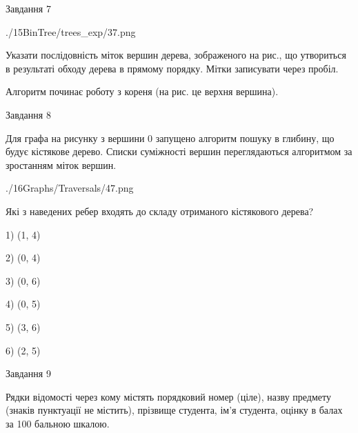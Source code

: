 \documentclass[12pt, ukrainian]{article}
\begin{document}
{\vspace{10mm}\par

\newpage
\begin{minipage}[t]{9.7cm}
               
{\begin{center}Завдання {7}\end{center}}
\vspace{-6mm}

\begin{center}
	{./15BinTree/trees_exp/37.png}
\end{center}
Указати послідовність міток вершин дерева, зображеного на рис., що утвориться в результаті обходу дерева в прямому порядку. Мітки записувати через пробіл.\par Алгоритм починає роботу з кореня (на рис. це верхня вершина).\par

\end{minipage}
\vline \hspace{8mm}
\begin{minipage}[t]{8.0cm}
               
{\begin{center}Завдання {8}\end{center}}
\vspace{-6mm}
Для графа на рисунку з вершини 0 запущено алгоритм пошуку в глибину, що будує кістякове дерево. Списки суміжності вершин переглядаються алгоритмом за зростанням міток вершин.\par
\begin{center}
	{./16Graphs/Traversals/47.png}
\end{center}
\par Які з наведених ребер входять до складу отриманого кістякового дерева?\par
1) (1, 4)\par
2) (0, 4)\par
3) (0, 6)\par
4) (0, 5)\par
5) (3, 6)\par
6) (2, 5)\par
{\vskip 15pt} \par

\end{minipage}

               
{\begin{center}Завдання {9}\end{center}}
\vspace{-6mm}
Рядки відомості через кому містять порядковий номер (ціле), назву предмету (зна\-ків пунктуації не містить), прізвище студента, ім'я студента, оцінку в балах за 100 бальною шкалою.

}
\end{document}
